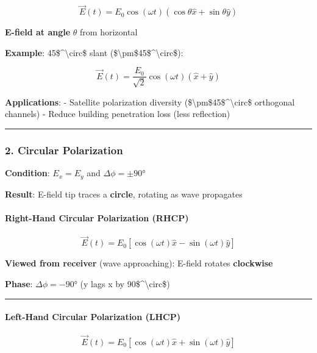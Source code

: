 \[
\vec{E}(t) = E_0 \cos(\omega t)(\cos\theta\hat{x} + \sin\theta\hat{y})
\]

\textbf{E-field at angle} \(\theta\) from horizontal

\textbf{Example}: 45\$\^{}\textbackslash circ\$ slant
(\$\textbackslash pm\$45\$\^{}\textbackslash circ\$):

\[
\vec{E}(t) = \frac{E_0}{\sqrt{2}} \cos(\omega t)(\hat{x} + \hat{y})
\]

\textbf{Applications}: - Satellite polarization diversity
(\$\textbackslash pm\$45\$\^{}\textbackslash circ\$ orthogonal channels)
- Reduce building penetration loss (less reflection)

\begin{center}\rule{0.5\linewidth}{0.5pt}\end{center}

\subsubsection{2. Circular Polarization}\label{circular-polarization}

\textbf{Condition}: \(E_x = E_y\) and \(\Delta\phi = \pm 90°\)

\textbf{Result}: E-field tip traces a \textbf{circle}, rotating as wave
propagates

\paragraph{Right-Hand Circular Polarization
(RHCP)}\label{right-hand-circular-polarization-rhcp}

\[
\vec{E}(t) = E_0[\cos(\omega t)\hat{x} - \sin(\omega t)\hat{y}]
\]

\textbf{Viewed from receiver} (wave approaching): E-field rotates
\textbf{clockwise}

\textbf{Phase}: \(\Delta\phi = -90°\) (y lags x by
90\$\^{}\textbackslash circ\$)

\begin{center}\rule{0.5\linewidth}{0.5pt}\end{center}

\paragraph{Left-Hand Circular Polarization
(LHCP)}\label{left-hand-circular-polarization-lhcp}

\[
\vec{E}(t) = E_0[\cos(\omega t)\hat{x} + \sin(\omega t)\hat{y}]
\]

